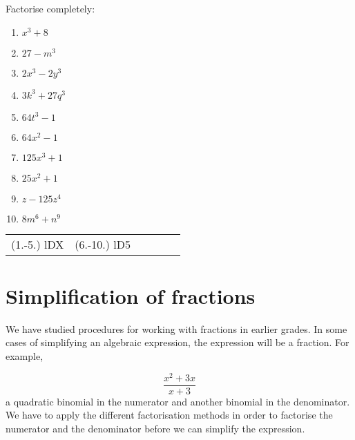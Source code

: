 \begin{exercises}{}
{

Factorise completely:
\begin{multicols}{2}
\begin{enumerate}[itemsep=5pt, label=\textbf{\arabic*}. ] 
\item ${x}^{3}+8$
\item $27-m^{3}$
\item $2x^{3}-2y^{3}$
\item $3k^{3} + 27q^{3}$
\item $64t^{3}-1$
\item $64x^{2} -1$
\item $125x^{3} +1$
\item $25x^{2} +1$
\item $z-125z^4{}$
\item $8m^{6} + n^{9}$
\end{enumerate}
\end{multicols}
\practiceinfo 
\par 
 \par \begin{tabular}[h]{cccccc}
 (1.-5.) lDX   & (6.-10.) lD5 &  \end{tabular}
}
\end{exercises}

\section{Simplification of fractions}
We have studied procedures for working with fractions in earlier grades.
In some cases of simplifying an algebraic expression, the expression will be a fraction. For example, 

\begin{equation*}
\dfrac{{x}^{2}+3x}{x+3}
\end{equation*}
\has a quadratic binomial in the numerator and another binomial in the denominator. We have to apply the different factorisation methods in order to factorise the numerator and the denominator before we can simplify the expression.\par 

